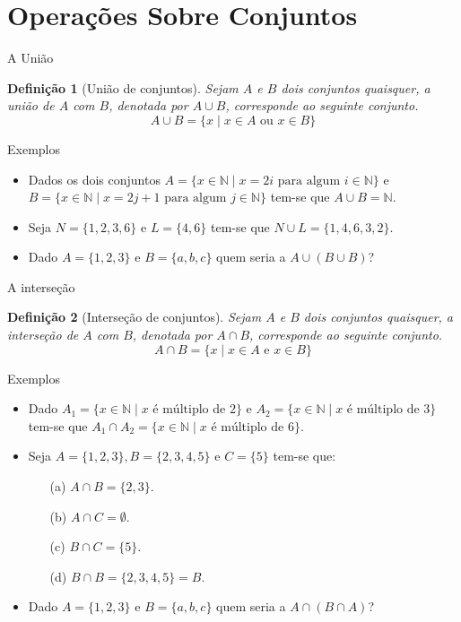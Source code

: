 \documentclass[aspectratio=169]{beamer}
\newtheorem{defi}{Definição}
\begin{document}
	\section{Operações Sobre Conjuntos}
	
	\begin{frame}{A União}
		\begin{defi}[União de conjuntos]\label{def:UniaoConjuntos}
			Sejam $A$ e $B$ dois conjuntos quaisquer, a união de $A$ com $B$, denotada por $A \cup B$, corresponde ao seguinte conjunto.
			$$A \cup B = \{x \mid x \in A \mbox{ ou } x \in B\}$$
		\end{defi}
	\end{frame}

	\begin{frame}{Exemplos}
		\begin{itemize}
			\item Dados os dois conjuntos $A = \{x \in \mathbb{N} \mid x = 2i \mbox{ para algum } i \in \mathbb{N}\}$ e $B = \{x \in \mathbb{N} \mid x = 2j + 1 \mbox{ para algum } j \in \mathbb{N}\}$ tem-se que $A \cup B = \mathbb{N}$.
			\item Seja $N = \{1, 2, 3, 6\}$ e $L = \{4, 6\}$ tem-se que $N \cup L = \{1, 4, 6, 3, 2\}$.
			\item Dado $A = \{1, 2, 3\}$ e $B = \{a, b, c\}$ quem seria a $A \cup (B \cup B)$?
		\end{itemize}
	\end{frame}

	\begin{frame}{A interseção}
		\begin{defi}[Interseção de conjuntos]\label{def:IntersecaoConjuntos}
			Sejam $A$ e $B$ dois conjuntos quaisquer, a interseção de $A$ com $B$, denotada por $A \cap B$, corresponde ao seguinte conjunto.
			$$A \cap B = \{x \mid x \in A \mbox{ e } x \in B\}$$
		\end{defi}
	\end{frame}

	\begin{frame}{Exemplos}
		\begin{itemize}
			\item Dado $A_1 = \{x \in \mathbb{N} \mid x \mbox{ é múltiplo de } 2\}$ e $A_2 = \{x \in \mathbb{N} \mid x \mbox{ é múltiplo de } 3\}$ tem-se que $A_1 \cap A_2 = \{x \in \mathbb{N} \mid x \mbox{ é múltiplo de } 6\}$.
			\item Seja $A = \{1, 2, 3\}, B = \{2, 3, 4, 5\}$ e $C = \{5\}$ tem-se que:
			\begin{itemize}
				\item[(a)] $A \cap B = \{2, 3\}$.
				\item[(b)] $A \cap C = \emptyset$.
				\item[(c)] $B \cap C = \{5\}$.
				\item[(d)] $B \cap B = \{2, 3, 4, 5\} = B$.
			\end{itemize}
			\item Dado $A = \{1, 2, 3\}$ e $B = \{a, b, c\}$ quem seria a $A \cap (B \cap A)$?
		\end{itemize}
	\end{frame}
\end{document}
